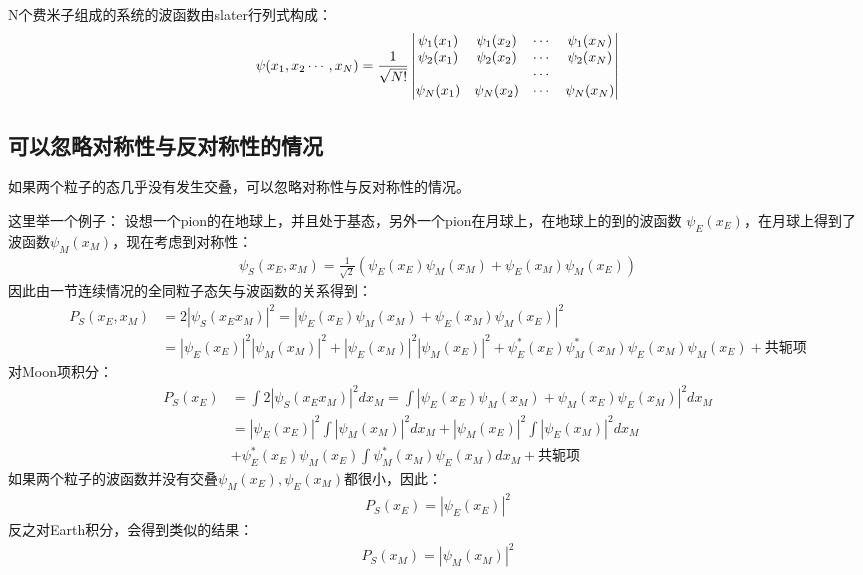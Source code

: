 \documentclass[UTF8]{article}
\numberwithin{equation}{section}
\begin{document}
N个费米子组成的系统的波函数由slater行列式构成：
\begin{align*}
    \psi(x_1,x_2\cdots,x_N)=\frac{1}{\sqrt{N!}}\mdet{\psi_1(x_1) & \psi_1(x_2) & \cdots & \psi_1(x_N) \\\psi_2(x_1)&\psi_2(x_2)&\cdots&\psi_2(x_N)\\
                                                                 &             & \cdots &             \\ \psi_N(x_1)&\psi_N(x_2)&\cdots&\psi_N(x_N)}
\end{align*}
\subsection{可以忽略对称性与反对称性的情况}
如果两个粒子的态几乎没有发生交叠，可以忽略对称性与反对称性的情况。

这里举一个例子：
设想一个pion的在地球上，并且处于基态，另外一个pion在月球上，在地球上的到的波函数
$\psi_E(x_E)$，在月球上得到了波函数$\psi_M(x_M)$，现在考虑到对称性：
\begin{align*}
    \psi_S(x_E,x_M)=\frac{1}{\sqrt{2}}(\psi_E(x_E)\psi_M(x_M)+\psi_E(x_M)\psi_M(x_E))
\end{align*}
因此由一节连续情况的全同粒子态矢与波函数的关系得到：
\begin{align*}
    P_S(x_E,x_M) & =2|\psi_S(x_Ex_M)|^2=|\psi_E(x_E)\psi_M(x_M)+\psi_E(x_M)\psi_M(x_E)|^2                    \\
                 & =|\psi_E(x_E)|^2|\psi_M(x_M)|^2+|\psi_E(x_M)|^2|\psi_M(x_E)|^2+\psi^*_E(x_E)\psi^*_M(x_M)
    \psi_E(x_M)\psi_M(x_E)+\text{共轭项}
\end{align*}
对Moon项积分：
\begin{align*}
    P_S(x_E) & =\int 2|\psi_S(x_Ex_M)|^2 dx_M=\int|\psi_E(x_E)\psi_M(x_M)+\psi_M(x_E) \psi_E(x_M)|^2dx_M \\
             & =|\psi_E(x_E)|^2\int|\psi_M(x_M)|^2dx_M+|\psi_M(x_E)|^2\int|\psi_E(x_M)|^2dx_M            \\
             & +\psi^*_E(x_E)\psi_M(x_E)\int \psi^*_M(x_M)
    \psi_E(x_M)dx_M+\text{共轭项}
\end{align*}
如果两个粒子的波函数并没有交叠$\psi_M(x_E),\psi_E(x_M)$都很小，因此：
\begin{align*}
    P_S(x_E)=|\psi_E(x_E)|^2
\end{align*}
反之对Earth积分，会得到类似的结果：
\begin{align*}
    P_S(x_M)=|\psi_M(x_M)|^2
\end{align*}
\end{document}
